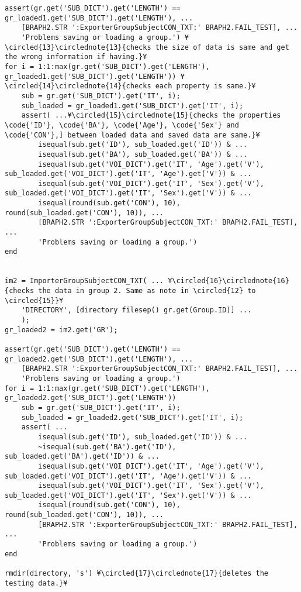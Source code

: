 \documentclass{tufte-handout}
\begin{document}
\begin{lstlisting}
assert(gr.get('SUB_DICT').get('LENGTH') == gr_loaded1.get('SUB_DICT').get('LENGTH'), ...
	[BRAPH2.STR ':ExporterGroupSubjectCON_TXT:' BRAPH2.FAIL_TEST], ...
    'Problems saving or loading a group.') ¥\circled{13}\circlednote{13}{checks the size of data is same and get the wrong information if having.}¥
for i = 1:1:max(gr.get('SUB_DICT').get('LENGTH'), gr_loaded1.get('SUB_DICT').get('LENGTH')) ¥\circled{14}\circlednote{14}{checks each property is same.}¥
    sub = gr.get('SUB_DICT').get('IT', i);
    sub_loaded = gr_loaded1.get('SUB_DICT').get('IT', i);    
    assert( ...¥\circled{15}\circlednote{15}{checks the properties \code{'ID'}, \code{'BA'}, \code{'Age'}, \code{'Sex'} and \code{'CON'},] between loaded data and saved data are same.}¥
        isequal(sub.get('ID'), sub_loaded.get('ID')) & ...
        isequal(sub.get('BA'), sub_loaded.get('BA')) & ... 
        isequal(sub.get('VOI_DICT').get('IT', 'Age').get('V'), sub_loaded.get('VOI_DICT').get('IT', 'Age').get('V')) & ... 
        isequal(sub.get('VOI_DICT').get('IT', 'Sex').get('V'), sub_loaded.get('VOI_DICT').get('IT', 'Sex').get('V')) & ...
        isequal(round(sub.get('CON'), 10), round(sub_loaded.get('CON'), 10)), ...
        [BRAPH2.STR ':ExporterGroupSubjectCON_TXT:' BRAPH2.FAIL_TEST], ...
        'Problems saving or loading a group.')    
end


im2 = ImporterGroupSubjectCON_TXT( ... ¥\circled{16}\circlednote{16}{checks the data in group 2. Same as note in \circled{12} to \circled{15}}¥
    'DIRECTORY', [directory filesep() gr.get(Group.ID)] ...
    );
gr_loaded2 = im2.get('GR');

assert(gr.get('SUB_DICT').get('LENGTH') == gr_loaded2.get('SUB_DICT').get('LENGTH'), ...
	[BRAPH2.STR ':ExporterGroupSubjectCON_TXT:' BRAPH2.FAIL_TEST], ...
    'Problems saving or loading a group.')
for i = 1:1:max(gr.get('SUB_DICT').get('LENGTH'), gr_loaded2.get('SUB_DICT').get('LENGTH'))
    sub = gr.get('SUB_DICT').get('IT', i);
    sub_loaded = gr_loaded2.get('SUB_DICT').get('IT', i);
    assert( ...
        isequal(sub.get('ID'), sub_loaded.get('ID')) & ...
        ~isequal(sub.get('BA').get('ID'), sub_loaded.get('BA').get('ID')) & ...
        isequal(sub.get('VOI_DICT').get('IT', 'Age').get('V'), sub_loaded.get('VOI_DICT').get('IT', 'Age').get('V')) & ... 
        isequal(sub.get('VOI_DICT').get('IT', 'Sex').get('V'), sub_loaded.get('VOI_DICT').get('IT', 'Sex').get('V')) & ...
        isequal(round(sub.get('CON'), 10), round(sub_loaded.get('CON'), 10)), ...
        [BRAPH2.STR ':ExporterGroupSubjectCON_TXT:' BRAPH2.FAIL_TEST], ...
        'Problems saving or loading a group.')    
end

rmdir(directory, 's') ¥\circled{17}\circlednote{17}{deletes the testing data.}¥
\end{lstlisting}
\clearpage
\end{document}
